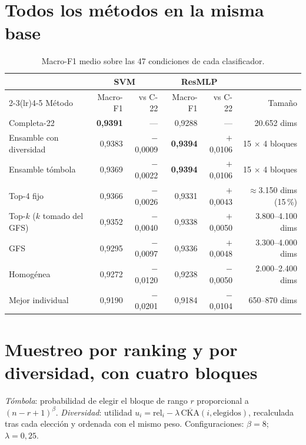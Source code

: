 \documentclass[11pt,a4paper]{article}
\newcommand{\pos}[1]{\textcolor{bien}{$+$#1}}
\newcommand{\negv}[1]{\textcolor{mal}{$-$#1}}
\begin{document}
\section{Todos los métodos en la misma base}

\begin{table}[H]
\centering
\caption{Macro-F1 medio sobre las 47 condiciones de cada clasificador.}
\label{tab:metodos}
\small
\begin{tabular}{@{}lrrrrr@{}}
\toprule
 & \multicolumn{2}{c}{SVM} & \multicolumn{2}{c}{ResMLP} & \\
\cmidrule(lr){2-3}\cmidrule(lr){4-5}
Método & Macro-F1 & vs C-22 & Macro-F1 & vs C-22 & Tamaño \\
\midrule
Completa-22 & \textbf{0,9391} & --- & 0,9288 & --- & 20.652 dims \\
Ensamble con diversidad & 0,9383 & \negv{0,0009} & \textbf{0,9394} & \pos{0,0106} & 15 $\times$ 4 bloques \\
Ensamble tómbola & 0,9369 & \negv{0,0022} & \textbf{0,9394} & \pos{0,0106} & 15 $\times$ 4 bloques \\
\rowcolor{resalte} Top-4 fijo & 0,9366 & \negv{0,0026} & 0,9331 & \pos{0,0043} & $\approx$3.150 dims (15\,\%) \\
Top-$k$ ($k$ tomado del GFS) & 0,9352 & \negv{0,0040} & 0,9338 & \pos{0,0050} & 3.800--4.100 dims \\
GFS & 0,9295 & \negv{0,0097} & 0,9336 & \pos{0,0048} & 3.300--4.000 dims \\
Homogénea & 0,9272 & \negv{0,0120} & 0,9238 & \negv{0,0050} & 2.000--2.400 dims \\
Mejor individual & 0,9190 & \negv{0,0201} & 0,9184 & \negv{0,0104} & 650--870 dims \\
\bottomrule
\end{tabular}
\end{table}

\section{Muestreo por ranking y por diversidad, con cuatro bloques}

\noindent\emph{Tómbola}: probabilidad de elegir el bloque de rango $r$
proporcional a $(n-r+1)^{\beta}$. \emph{Diversidad}: utilidad
$u_i = \text{rel}_i - \lambda\,\overline{\text{CKA}}(i, \text{elegidos})$,
recalculada tras cada elección y ordenada con el mismo peso. Configuraciones:
$\beta=8$; $\lambda=0{,}25$.
\end{document}
